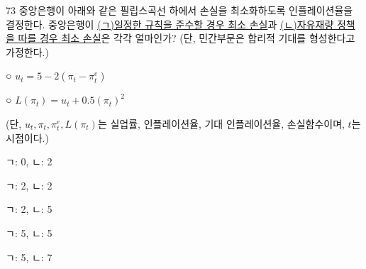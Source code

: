 \begin{question}{73}
중앙은행이 아래와 같은 필립스곡선 하에서 손실을 최소화하도록 인플레이션율을 결정한다. 중앙은행이 \uline{(ㄱ)일정한 규칙을 준수할 경우 최소 손실}과 \uline{(ㄴ)자유재량 정책을 따를 경우 최소 손실}은 각각 얼마인가? (단, 민간부문은 합리적 기대를 형성한다고 가정한다.)
\begin{framedtext}
○ $u_{t}=5-2(\pi_{t}-\pi^{e}_{t})$ \par
○ $L(\pi_{t})=u_{t}+0.5(\pi_{t})^{2}$ \par
(단, $u_{t},\pi_{t},\pi^{e}_{t},L(\pi_{t})$는 실업률, 인플레이션율, 기대 인플레이션율, 손실함수이며, $t$는 시점이다.) \par
\end{framedtext}
\begin{choices}
  \item ㄱ: 0, ㄴ: 2
  \item ㄱ: 2, ㄴ: 2
  \item ㄱ: 2, ㄴ: 5
  \item ㄱ: 5, ㄴ: 5
  \item ㄱ: 5, ㄴ: 7
\end{choices}
\end{question}
